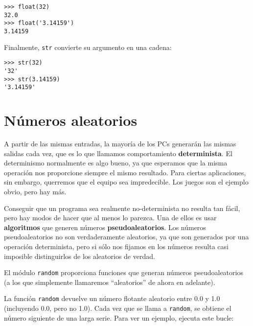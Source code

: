 
\beforeverb
\begin{verbatim}
>>> float(32)
32.0
>>> float('3.14159')
3.14159
\end{verbatim}
\afterverb
%
Finalmente, {\tt str} convierte su argumento en una cadena:


\beforeverb
\begin{verbatim}
>>> str(32)
'32'
>>> str(3.14159)
'3.14159'
\end{verbatim}
\afterverb
%

\section{Números aleatorios}


A partir de las mismas entradas, la mayoría de los PCs generarán
las mismas salidas cada vez, que es lo que llamamos comportamiento {\bf determinista}.
El determinismo normalmente es algo bueno, ya que esperamos que la misma
operación nos proporcione siempre el mismo resultado. Para ciertas aplicaciones, sin embargo,
querremos que el equipo sea impredecible. Los juegos son el ejemplo
obvio, pero hay más.

Conseguir que un programa sea realmente no-determinista no resulta tan fácil,
pero hay modos de hacer que al menos lo parezca. Una de ellos
es usar {\bf algoritmos} que generen números {\bf pseudoaleatorios}.
Los números pseudoaleatorios no son verdaderamente aleatorios, ya que son
generados por una operación determinista, pero si sólo nos fijamos en los números
resulta casi imposible distinguirlos de los aleatorios de verdad.


El módulo {\tt random} proporciona funciones que generan
números pseudoaleatorios (a los que simplemente llamaremos ``aleatorios''
de ahora en adelante).


La función {\tt random} devuelve un número flotante aleatorio
entre 0.0 y 1.0 (incluyendo 0.0, pero no 1.0). Cada vez que se
llama a {\tt random}, se obtiene el número siguiente de una larga serie. Para ver
un ejemplo, ejecuta este bucle:

